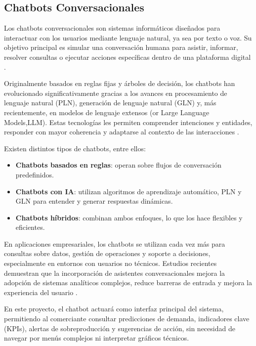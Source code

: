 \subsection{Chatbots Conversacionales}

Los chatbots conversacionales son sistemas informáticos diseñados para interactuar con los usuarios mediante lenguaje natural, ya sea por texto o voz. Su objetivo principal es simular una conversación humana para asistir, informar, resolver consultas o ejecutar acciones específicas dentro de una plataforma digital \parencite{radziwill2017}.

Originalmente basados en reglas fijas y árboles de decisión, los chatbots han evolucionado significativamente gracias a los avances en procesamiento de lenguaje natural (PLN), generación de lenguaje natural (GLN) y, más recientemente, en modelos de lenguaje extensos (or Large Language Models,LLM). Estas tecnologías les permiten comprender intenciones y entidades, responder con mayor coherencia y adaptarse al contexto de las interacciones \parencite{shum2018}.

Existen distintos tipos de chatbots, entre ellos:

\begin{itemize}
    \item \textbf{Chatbots basados en reglas}: operan sobre flujos de conversación predefinidos.
    
    \item \textbf{Chatbots con IA}: utilizan algoritmos de aprendizaje automático, PLN y GLN para entender y generar respuestas dinámicas.
    
    \item \textbf{Chatbots híbridos}: combinan ambos enfoques, lo que los hace flexibles y eficientes.
\end{itemize}

En aplicaciones empresariales, los chatbots se utilizan cada vez más para consultas sobre datos, gestión de operaciones y soporte a decisiones, especialmente en entornos con usuarios no técnicos. Estudios recientes demuestran que la incorporación de asistentes conversacionales mejora la adopción de sistemas analíticos complejos, reduce barreras de entrada y mejora la experiencia del usuario \parencite{knote2021}.

En este proyecto, el chatbot actuará como interfaz principal del sistema, permitiendo al comerciante consultar predicciones de demanda, indicadores clave (KPIs), alertas de sobreproducción y sugerencias de acción, sin necesidad de navegar por menús complejos ni interpretar gráficos técnicos.

